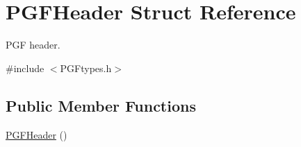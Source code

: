 \hypertarget{structPGFHeader}{}\section{P\+G\+F\+Header Struct Reference}
\label{structPGFHeader}


P\+GF header.  




{\ttfamily \#include $<$P\+G\+Ftypes.\+h$>$}

\subsection*{Public Member Functions}
\begin{DoxyCompactItemize}
\item 
\mbox{\hyperlink{structPGFHeader_acdc6457170d5adce40fa0c05d0c09ed2}{P\+G\+F\+Header}} ()
\end{DoxyCompactItemize}
